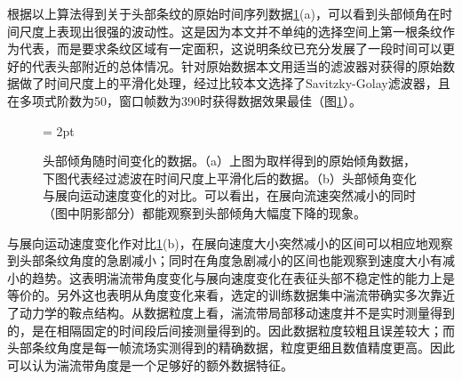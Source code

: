 根据以上算法得到关于头部条纹的原始时间序列数据\ref{fig:angle_process}(a)，可以看到头部倾角在时间尺度上表现出很强的波动性。这是因为本文并不单纯的选择空间上第一根条纹作为代表，而是要求条纹区域有一定面积，这说明条纹已充分发展了一段时间可以更好的代表头部附近的总体情况。针对原始数据本文用适当的滤波器对获得的原始数据做了时间尺度上的平滑化处理，经过比较本文选择了Savitzky-Golay滤波器，且在多项式阶数为50，窗口帧数为390时获得数据效果最佳（图\ref{fig:angle_process}）。
\begin{figure}[H]
	\subfigbottomskip = 2pt
	\begin{minipage}[h]{\linewidth}
	\centering
	\end{minipage}
	\quad
	\begin{minipage}[h]{1\linewidth}
	\centering
	\end{minipage}
	\quad
	\caption{头部倾角随时间变化的数据。（a）上图为取样得到的原始倾角数据，下图代表经过滤波在时间尺度上平滑化后的数据。（b）头部倾角变化与展向运动速度变化的对比。可以看出，在展向流速突然减小的同时（图中阴影部分）都能观察到头部倾角大幅度下降的现象。}
\label{fig:angle_process}
\end{figure}

与展向运动速度变化作对比\ref{fig:angle_process}(b)，在展向速度大小突然减小的区间可以相应地观察到头部条纹角度的急剧减小；同时在角度急剧减小的区间也能观察到速度大小有减小的趋势。这表明湍流带角度变化与展向速度变化在表征头部不稳定性的能力上是等价的。另外这也表明从角度变化来看，选定的训练数据集中湍流带确实多次靠近了动力学的鞍点结构。从数据粒度上看，湍流带局部移动速度并不是实时测量得到的，是在相隔固定的时间段后间接测量得到的。因此数据粒度较粗且误差较大；而头部条纹角度是每一帧流场实测得到的精确数据，粒度更细且数值精度更高。因此可以认为湍流带角度是一个足够好的额外数据特征。

